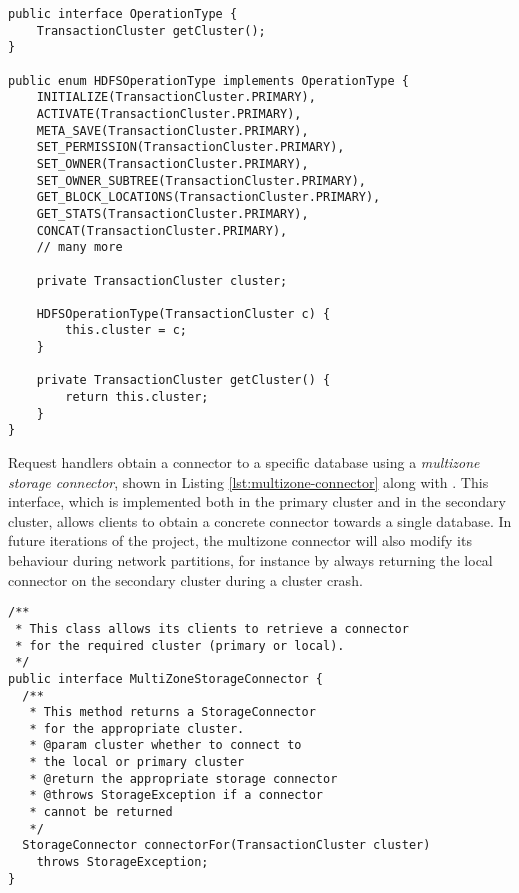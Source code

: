 \begin{lstlisting}[label={lst:optype-enum}, caption={The OperationType enum}]
public interface OperationType {
    TransactionCluster getCluster();
} 

public enum HDFSOperationType implements OperationType {
    INITIALIZE(TransactionCluster.PRIMARY),
    ACTIVATE(TransactionCluster.PRIMARY),
    META_SAVE(TransactionCluster.PRIMARY),
    SET_PERMISSION(TransactionCluster.PRIMARY),
    SET_OWNER(TransactionCluster.PRIMARY),
    SET_OWNER_SUBTREE(TransactionCluster.PRIMARY),
    GET_BLOCK_LOCATIONS(TransactionCluster.PRIMARY),
    GET_STATS(TransactionCluster.PRIMARY),
    CONCAT(TransactionCluster.PRIMARY),
    // many more

    private TransactionCluster cluster;

    HDFSOperationType(TransactionCluster c) {
        this.cluster = c;
    }

    private TransactionCluster getCluster() {
        return this.cluster;
    }
}
\end{lstlisting}

Request handlers obtain a connector to a specific database using a \emph{multizone storage connector}, shown in Listing \ref{lst:multizone-connector} along with .
This interface, which is implemented both in the primary cluster and in the secondary cluster, allows clients to obtain a concrete connector towards a single database.
In future iterations of the project, the multizone connector will also modify its behaviour during network partitions, for instance by always returning the local connector on the secondary cluster during a cluster crash.
\begin{lstlisting}[label={lst:multizone-connector}, caption={The MultiZoneStorageConnector interface}]
/**
 * This class allows its clients to retrieve a connector 
 * for the required cluster (primary or local).
 */
public interface MultiZoneStorageConnector {
  /**
   * This method returns a StorageConnector
   * for the appropriate cluster.
   * @param cluster whether to connect to
   * the local or primary cluster
   * @return the appropriate storage connector
   * @throws StorageException if a connector
   * cannot be returned
   */
  StorageConnector connectorFor(TransactionCluster cluster)
    throws StorageException;
}
\end{lstlisting}

